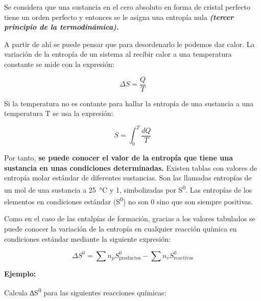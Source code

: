 \documentclass[
  spanish,
]{article}
\begin{document}
\hfill{}

Se considera que una sustancia en el cero absoluto en forma de cristal
perfecto tiene un orden perfecto y entonces se le asigna una entropía
nula \textbf{\emph{(tercer principio de la termodinámica).}}

A partir de ahí se puede pensar que para desordenarlo le podemos dar
calor. La variación de la entropía de un sistema al recibir calor a una
temperatura constante se mide con la expresión:

\[\Delta S = \frac{Q}{T}\]

Si la temperatura no es contante para hallar la entropía de una
sustancia a una temperatura T se usa la expresión:

\[S = \int_{0}^{T}\frac{dQ}{T}\]

Por tanto, \textbf{se puede conocer el valor de la entropía que tiene
una sustancia en unas condiciones determinadas.} Existen tablas con
valores de entropía molar estándar de diferentes sustancias. Son las
llamadas entropías de un mol de una sustancia a \qty{25}{\degreeCelsius}
y \qty{1}{\atm}, simbolizadas por S\textsuperscript{0}. Las entropías de
los elementos en condiciones estándar (S\textsuperscript{0}) no son 0
sino que son siempre positivas.

Como en el caso de las entalpías de formación, gracias a los valores
tabulados se puede conocer la variación de la entropía en cualquier
reacción química en condiciones estándar mediante la siguiente
expresión:

\[\Delta S^0 = \sum n_p S_\text{productos}^0 - \sum n_r S_\text{reactivos}^0\]

\textbf{Ejemplo:}

Calcula ∆S\textsuperscript{0} para las siguientes reacciones químicas:
\end{document}

